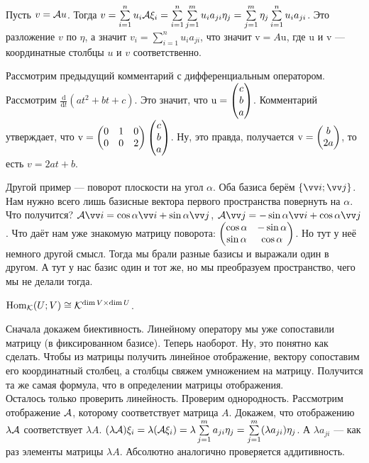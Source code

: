 \documentclass{article}
\let\vec\vv
\begin{document}
\begin{itemize}
\begin{Example}
        \end{Example}
        \begin{Comment}
            Пусть $v={\mathcal{A}} u$. Тогда $v=\sum\limits_{i=1}^nu_i{\mathcal{A}}\xi_i=\sum\limits_{i=1}^n\sum\limits_{j=1}^mu_ia_{ji}\eta_j=\sum\limits_{j=1}^m\eta_j\sum\limits_{i=1}^nu_ia_{ji}$. Это разложение $v$ по $\eta$, а значит $v_i=\sum\limits_{i=1}^nu_ia_{ji}$, что значит $\mathrm v=A\mathrm u$, где $\mathrm u$ и $\mathrm v$ --- координатные столбцы $u$ и $v$ соответственно.
        \end{Comment}
        \begin{Example}
            Рассмотрим предыдущий комментарий с дифференциальным оператором. Рассмотрим $\frac{\mathrm d}{\mathrm dt}(at^2+bt+c)$. Это значит, что $\mathrm u=\left(\begin{matrix}c\\b\\a\end{matrix}\right)$. Комментарий утверждает, что $\mathrm v=\left(\begin{matrix}0 & 1 & 0\\0 & 0 & 2\end{matrix}\right)\left(\begin{matrix}c\\b\\a\end{matrix}\right)$. Ну, это правда, получается $\mathrm v=\left(\begin{matrix}b\\2a\end{matrix}\right)$, то есть $v=2at+b$.
        \end{Example}
        \begin{Example}
            Другой пример --- поворот плоскости на угол $\alpha$. Оба базиса берём $\{\vec i;\vec j\}$. Нам нужно всего лишь базисные вектора первого пространства повернуть на $\alpha$. Что получится? $\scriptA\vec i=\cos\alpha\vec i+\sin\alpha\vec j$, $\scriptA\vec j=-\sin\alpha\vec i+\cos\alpha\vec j$. Что даёт нам уже знакомую матрицу поворота: $\left(\begin{matrix}\cos\alpha & -\sin\alpha\\\sin\alpha & \cos\alpha\end{matrix}\right)$. Но тут у неё немного другой смысл. Тогда мы брали разные базисы и выражали один в другом. А тут у нас базис один и тот же, но мы преобразуем пространство, чего мы не делали тогда.
        \end{Example}
        \thm $\operatorname{Hom}_{\mathcal{K}}(U;V)\cong{\mathcal{K}}^{\dim V\times\dim U}$.
        \begin{Proof}
            Сначала докажем биективность. Линейному оператору мы уже сопоставили матрицу (в фиксированном базисе). Теперь наоборот. Ну, это понятно как сделать. Чтобы из матрицы получить линейное отображение, вектору сопоставим его координатный столбец, а столбцы свяжем умножением на матрицу. Получится та же самая формула, что в определении матрицы отображения.\\
            Осталось только проверить линейность. Проверим однородность. Рассмотрим отображение ${\mathcal{A}}$, которому соответствует матрица $A$. Докажем, что отображению $\lambda{\mathcal{A}}$ соответствует $\lambda A$. $(\lambda{\mathcal{A}})\xi_i=\lambda({\mathcal{A}}\xi_i)=\lambda\sum\limits_{j=1}^ma_{ji}\eta_j=\sum\limits_{j=1}^m(\lambda a_{ji})\eta_j$. А $\lambda a_{ji}$ --- как раз элементы матрицы $\lambda A$. Абсолютно аналогично проверяется аддитивность.

\end{Proof}
\end{itemize}
\end{document}
